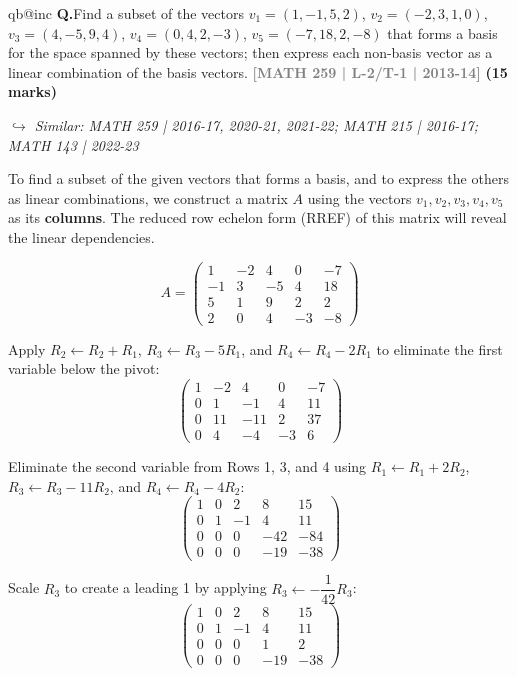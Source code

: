 \documentclass[12pt,a3paper]{article}
\makeatletter
\newcommand{\yr}[1]{\hfill\textcolor{gray}{\small\textbf{[#1]}}}
\newcommand{\mk}[1]{\textcolor{orange!70!black}{\small\textbf{(#1 marks)}}}
\newcommand{\variant}[1]{\par\vspace{1pt}\textcolor{blue!50!black}%
  {\footnotesize\textit{$\hookrightarrow$ Similar: #1}}}
\newcounter{qnum}
\newcommand{\Q}[1]{%
  \csname qb@inc\endcsname
  \needspace{4\baselineskip}
  \refstepcounter{qnum}
  \vspace{6pt}
  \noindent\textbf{Q\theqnum.}\enspace #1\par
}
\makeatother
\begin{document}
\Q{Find a subset of the vectors $v_1 = (1,-1,5,2)$, $v_2 = (-2,3,1,0)$, $v_3 = (4,-5,9,4)$, $v_4 = (0,4,2,-3)$, $v_5 = (-7,18,2,-8)$ that forms a basis for the space spanned by these vectors; then express each non-basis vector as a linear combination of the basis vectors.
\yr{MATH 259 | L-2/T-1 | 2013-14} \mk{15}
\variant{MATH 259 | 2016-17, 2020-21, 2021-22; MATH 215 | 2016-17; MATH 143 | 2022-23}}
\begin{tcolorbox}[enhanced,breakable,
  colback=cC!4,colframe=cC,boxrule=0.8pt,arc=5pt,
  title={\textbf{Answer --- Basis and Linear Combinations}},
  fonttitle=\bfseries\color{white},colbacktitle=cC]

To find a subset of the given vectors that forms a basis, and to express the others as linear combinations, we construct a matrix $A$ using the vectors $v_1, v_2, v_3, v_4, v_5$ as its \textbf{columns}. The reduced row echelon form (RREF) of this matrix will reveal the linear dependencies.

\[
A = \begin{pmatrix}
1 & -2 & 4 & 0 & -7 \\
-1 & 3 & -5 & 4 & 18 \\
5 & 1 & 9 & 2 & 2 \\
2 & 0 & 4 & -3 & -8
\end{pmatrix}
\]

Apply $R_2 \leftarrow R_2 + R_1$, $R_3 \leftarrow R_3 - 5R_1$, and $R_4 \leftarrow R_4 - 2R_1$ to eliminate the first variable below the pivot:
\[
\begin{pmatrix}
1 & -2 & 4 & 0 & -7 \\
0 & 1 & -1 & 4 & 11 \\
0 & 11 & -11 & 2 & 37 \\
0 & 4 & -4 & -3 & 6
\end{pmatrix}
\]

Eliminate the second variable from Rows 1, 3, and 4 using $R_1 \leftarrow R_1 + 2R_2$, $R_3 \leftarrow R_3 - 11R_2$, and $R_4 \leftarrow R_4 - 4R_2$:
\[
\begin{pmatrix}
1 & 0 & 2 & 8 & 15 \\
0 & 1 & -1 & 4 & 11 \\
0 & 0 & 0 & -42 & -84 \\
0 & 0 & 0 & -19 & -38
\end{pmatrix}
\]

Scale $R_3$ to create a leading 1 by applying $R_3 \leftarrow -\dfrac{1}{42}R_3$:
\[
\begin{pmatrix}
1 & 0 & 2 & 8 & 15 \\
0 & 1 & -1 & 4 & 11 \\
0 & 0 & 0 & 1 & 2 \\
0 & 0 & 0 & -19 & -38
\end{pmatrix}
\]


\end{tcolorbox}
\end{document}
